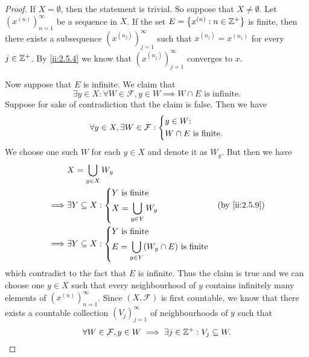 \begin{proof}
  If \(X = \emptyset\), then the statement is trivial.
  So suppose that \(X \neq \emptyset\).
  Let \((x^{(n)})_{n = 1}^\infty\) be a sequence in \(X\).
  If the set \(E = \left\lbrace x^{(n)} : n \in \mathbb{Z}^+\right\rbrace\) is finite, then there exists a subsequence \((x^{(n_j)})_{j = 1}^\infty\) such that \(x^{(n_j)} = x^{(n_1)}\) for every \(j \in \mathbb{Z}^+\).
  By \cref{ii:2.5.4} we know that \((x^{(n_j)})_{j = 1}^\infty\) converges to \(x\).

  Now suppose that \(E\) is infinite.
  We claim that
  \[
    \exists y \in X : \forall W \in \mathcal{F}, y \in W \implies W \cap E \text{ is infinite}.
  \]
  Suppose for sake of contradiction that the claim is false.
  Then we have
  \[
    \forall y \in X, \exists W \in \mathcal{F} : \begin{dcases}
      y \in W; \\
      W \cap E \text{ is finite}.
    \end{dcases}
  \]
  We choose one such \(W\) for each \(y \in X\) and denote it as \(W_y\).
  But then we have
  \begin{align*}
             & X = \bigcup_{y \in X} W_y                                                   \\
    \implies & \exists Y \subseteq X : \begin{dcases}
                                         Y \text{ is finite} \\
                                         X = \bigcup_{y \in Y} W_y
                                       \end{dcases}               &  & \by{ii:2.5.9}       \\
    \implies & \exists Y \subseteq X : \begin{dcases}
                                         Y \text{ is finite} \\
                                         E = \bigcup_{y \in Y} (W_y \cap E) \text{ is finite}
                                       \end{dcases}
  \end{align*}
  which contradict to the fact that \(E\) is infinite.
  Thus the claim is true and we can choose one \(y \in X\) such that every neighbourhood of \(y\) contains infinitely many elements of \((x^{(n)})_{n = 1}^\infty\).
  Since \((X, \mathcal{F})\) is first countable, we know that there exists a countable collection \((V_j)_{j = 1}^\infty\) of neighbourhoods of \(y\) such that
  \[
    \forall W \in \mathcal{F}, y \in W \implies \exists j \in \mathbb{Z}^+ : V_j \subseteq W.
\]
\end{proof}
